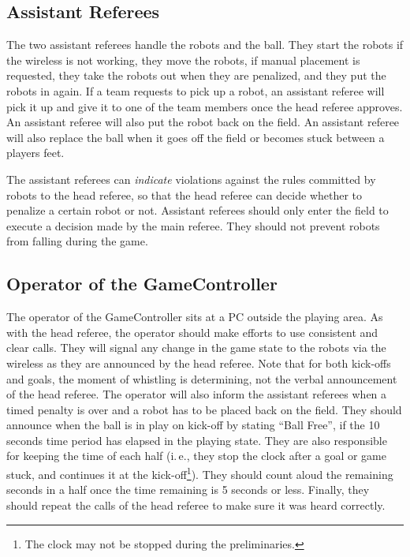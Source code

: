 \documentclass[12pt]{article}
\newcommand{\ie}{\mbox{i.\,e.}\xspace}
\newcommand{\KickOffBallFreeTime}{10 seconds\xspace}
\begin{document}
\subsection{Assistant Referees}
\label{sec:assist_referee}
The two assistant referees handle the robots and the ball. They start the robots if the wireless is not working, they move the robots, if manual placement is requested, they take the robots out when they are penalized, and they put the robots in again. If a team requests to pick up a robot, an assistant referee will pick it up and give it to one of the team members once the head referee approves. An assistant referee will also put the robot back on the field. An assistant referee will also replace the ball when it goes off the field or becomes stuck between a players feet. 

The assistant referees can \textit{indicate} violations against the rules committed by robots to the head referee, so that the head referee can decide whether to penalize a certain robot or not. Assistant referees should only enter the field to execute a decision made by the main referee. They should not prevent robots from falling during the game.

\subsection{Operator of the GameController}
\label{sec:gameControllerOp}
The operator of the GameController sits at a PC outside the playing area. 
As with the head referee, the operator should make efforts to use consistent and clear calls.
They will signal any change in the game state to the robots via the wireless as they are announced by the head referee.
Note that for both kick-offs and goals, the moment of whistling is determining, not the verbal announcement of the head referee. 
The operator will also inform the assistant referees when a timed penalty is over and a robot has to be placed back on the field.
They should announce when the ball is in play on kick-off by stating ``Ball Free'', if the \KickOffBallFreeTime time period has elapsed in the playing state.
They are also responsible for keeping the time of each half (\ie, they stop the clock after a goal or game stuck, and continues it at the kick-off\footnote{The clock may not be stopped during the preliminaries.}). 
They should count aloud the remaining seconds in a half once the time remaining is 5 seconds or less.
Finally, they should repeat the calls of the head referee to make sure it was heard correctly.
\end{document}
